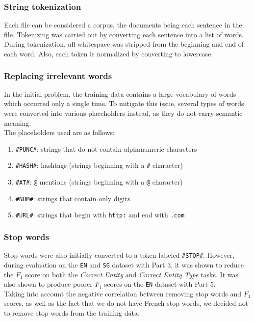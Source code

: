 \documentclass{article}
\numberwithin{equation}{section}
\begin{document}
\subsubsection{String tokenization}
Each file can be considered a corpus, the documents being each sentence in the file. Tokenizing was carried out by converting each sentence into a list of words. During tokenization, all whitespace was stripped from the beginning and end of each word. Also, each token is normalized by converting to lowercase.

\subsubsection{Replacing irrelevant words}
In the initial problem, the training data contains a large vocabulary of words which occurred only a single time. To mitigate this issue, several types of words were converted into various placeholders instead, as they do not carry semantic meaning. \\

The placeholders used are as follows:
\begin{enumerate}
	\item \lstinline{#PUNC#}: strings that do not contain alphanumeric characters
	\item \lstinline{#HASH#}: hashtags (strings beginning with a \lstinline{#} character)
	\item \lstinline{#AT#}: \lstinline{@} mentions (strings beginning with a \lstinline{@} character)
	\item \lstinline{#NUM#}: strings that contain only digits
	\item \lstinline{#URL#}: strings that begin with \lstinline{http:} and end with \lstinline{.com}
\end{enumerate}

\subsubsection{Stop words}
Stop words were also initially converted to a token labeled \lstinline{#STOP#}. However, during evaluation on the \lstinline{EN} and \lstinline{SG} dataset with Part 3, it was shown to reduce the $F_1$ score on both the \emph{Correct Entity} and \emph{Correct Entity Type} tasks. It was also shown to produce poorer $F_1$ scores on the \lstinline{EN} dataset with Part 5. \\

Taking into account the negative correlation between removing stop words and $F_1$ scores, as well as the fact that we do not have French stop words, we decided not to remove stop words from the training data.
\end{document}

